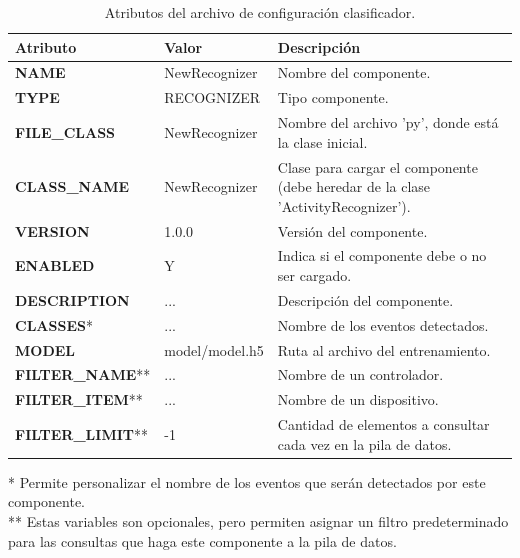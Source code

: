             \begin{table}[ht!]
            \caption[Archivo de configuración clasificador]{Atributos del archivo de configuración clasificador.}
            \label{Tab:ConfigFileHAR}
            \centering
            \begin{tabular}{ | l l p{7cm} | } 
                \hline
                \textbf{Atributo}       & \textbf{Valor} & \textbf{Descripción} \\ 
                \hline\hline
                \textbf{NAME}           & NewRecognizer & Nombre del componente.\\
                \hline
                \textbf{TYPE}           & RECOGNIZER    & Tipo componente.\\
                \hline
                \textbf{FILE\_CLASS}    & NewRecognizer & Nombre del archivo 'py', donde está la clase inicial.\\
                \hline
                \textbf{CLASS\_NAME}    & NewRecognizer & Clase para cargar el componente (debe heredar de la clase 'ActivityRecognizer').\\
                \hline
                \textbf{VERSION}        & 1.0.0         &  Versión del componente.\\
                \hline
                \textbf{ENABLED}        & Y             & Indica si el componente debe o no ser cargado.\\
                \hline
                \textbf{DESCRIPTION}    & ...           &  Descripción del componente.\\
                \hline
                \textbf{CLASSES}*       & ...           & Nombre de los eventos detectados.\\
                \hline
                \textbf{MODEL}          & model/model.h5 & Ruta al archivo del entrenamiento.\\
                \hline
                \textbf{FILTER\_NAME}** & ...           & Nombre de un controlador.\\
                \hline
                \textbf{FILTER\_ITEM}** & ...           & Nombre de un dispositivo.\\
                \hline
                \textbf{FILTER\_LIMIT}**& -1            & Cantidad de elementos a consultar cada vez en la pila de datos.\\
                \hline
            \end{tabular}
            \newline
            * Permite personalizar el nombre de los eventos que serán detectados por este componente.\\
            ** Estas variables son opcionales, pero permiten asignar un filtro predeterminado para las consultas que haga este componente a la pila de datos.
            \end{table}
            
